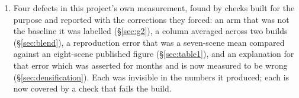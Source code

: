 \begin{enumerate}[leftmargin=1.4em,itemsep=2pt]
        primitive count matches the baseline's to $0.2\,\%$
        (\S\ref{sec:methodcost}). A reduction theorem says the output is
        identical; only a measurement says what the identity costs.
  \item Four defects in this project's own measurement, found by checks built
        for the purpose and reported with the corrections they forced: an arm
        that was not the baseline it was labelled (\S\ref{sec:g2}), a column
        averaged across two builds (\S\ref{sec:blend}), a reproduction error
        that was a seven-scene mean compared against an eight-scene published
        figure (\S\ref{sec:table1}), and an explanation for that error which
        was asserted for months and is now measured to be wrong
        (\S\ref{sec:densification}). Each was invisible in the numbers it
        produced; each is now covered by a check that fails the build.
\end{enumerate}
